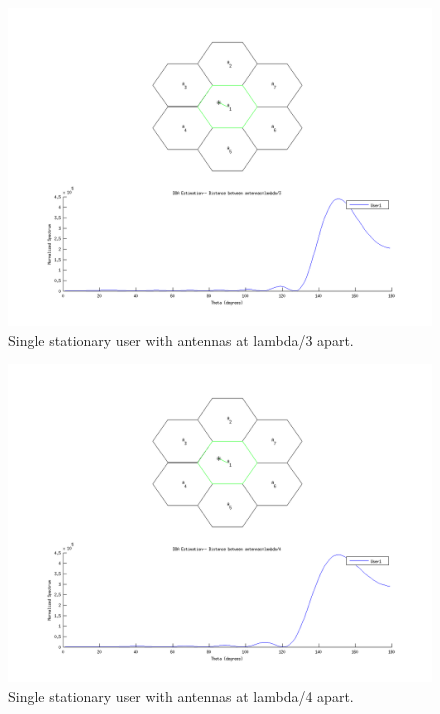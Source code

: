 \documentclass{article}
\begin{document}
\begin{figure}[h]
\centerline{\includegraphics[width=5in]{doc/partB3.png}}
\caption{Single stationary user with antennas at lambda/3 apart.}
\label{partb3}
\end{figure}

\begin{figure}[h]
\centerline{\includegraphics[width=5in]{doc/partB4.png}}
\caption{Single stationary user with antennas at lambda/4 apart.}
\label{partb4}
\end{figure}
\end{document}
